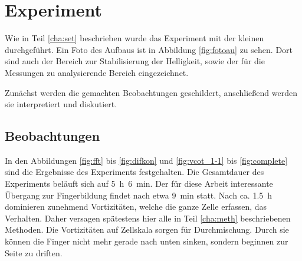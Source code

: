 % 



\section{\COTm Experiment}
\label{res:cot}


Wie in Teil \ref{cha:set} beschrieben wurde das \COTm Experiment mit der kleinen \HSC durchgeführt. Ein Foto des Aufbaus ist in Abbildung \ref{fig:fotoau} zu sehen. Dort sind auch der Bereich zur Stabilisierung der Helligkeit, sowie der für die Messungen zu analysierende Bereich eingezeichnet.

Zunächst werden die gemachten Beobachtungen geschildert, anschließend werden sie interpretiert und diskutiert.


\subsection{Beobachtungen}
\label{res:cot:beob}



In den Abbildungen \ref{fig:fft} bis \ref{fig:difkon} und \ref{fig:vcot_1-1} bis \ref{fig:complete} sind die Ergebnisse des \COTm Experiments festgehalten. Die Gesamtdauer des Experiments beläuft sich auf \mbox{\SI{5}{\hour} \SI{6}{\minute}}. Der für diese Arbeit interessante Übergang zur Fingerbildung findet nach etwa \SI{9}{\minute} statt. Nach ca. \SI{1,5}{\hour} dominieren zunehmend Vortizitäten, welche die ganze Zelle erfassen, das Verhalten. Daher versagen spätestens hier alle in Teil \ref{cha:meth} beschriebenen Methoden. 
Die Vortizitäten auf Zellskala sorgen für Durchmischung. Durch sie können die Finger nicht mehr gerade nach unten sinken, sondern beginnen zur Seite zu driften.

